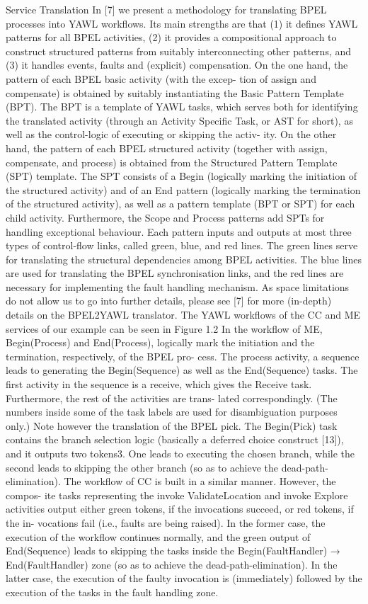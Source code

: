 Service Translation
In [7] we present a methodology for translating BPEL processes into YAWL
workflows. Its main strengths are that (1) it defines YAWL patterns for all
BPEL activities, (2) it provides a compositional approach to construct structured
patterns from suitably interconnecting other patterns, and (3) it handles events,
faults and (explicit) compensation.
On the one hand, the pattern of each BPEL basic activity (with the excep-
tion of assign and compensate) is obtained by suitably instantiating the Basic
Pattern Template (BPT). The BPT is a template of YAWL tasks, which serves
both for identifying the translated activity (through an Activity Specific Task,
or AST for short), as well as the control-logic of executing or skipping the activ-
ity. On the other hand, the pattern of each BPEL structured activity (together
with assign, compensate, and process) is obtained from the Structured Pattern
Template (SPT) template. The SPT consists of a Begin (logically marking the
initiation of the structured activity) and of an End pattern (logically marking
the termination of the structured activity), as well as a pattern template (BPT
or SPT) for each child activity. Furthermore, the Scope and Process patterns add
SPTs for handling exceptional behaviour. Each pattern inputs and outputs at
most three types of control-flow links, called green, blue, and red lines. The green
lines serve for translating the structural dependencies among BPEL activities.
The blue lines are used for translating the BPEL synchronisation links, and the
red lines are necessary for implementing the fault handling mechanism. As space
limitations do not allow us to go into further details, please see [7] for more
(in-depth) details on the BPEL2YAWL translator.
The YAWL workflows of the CC and ME services of our example can be
seen in Figure 1.2 In the workflow of ME, Begin(Process) and End(Process),
logically mark the initiation and the termination, respectively, of the BPEL pro-
cess. The process activity, a sequence leads to generating the Begin(Sequence) as
well as the End(Sequence) tasks. The first activity in the sequence is a receive,
which gives the Receive task. Furthermore, the rest of the activities are trans-
lated correspondingly. (The numbers inside some of the task labels are used for
disambiguation purposes only.) Note however the translation of the BPEL pick.
The Begin(Pick) task contains the branch selection logic (basically a deferred
choice construct [13]), and it outputs two tokens3. One leads to executing the
chosen branch, while the second leads to skipping the other branch (so as to
achieve the dead-path-elimination).
The workflow of CC is built in a similar manner. However, the compos-
ite tasks representing the invoke ValidateLocation and invoke Explore activities
output either green tokens, if the invocations succeed, or red tokens, if the in-
vocations fail (i.e., faults are being raised). In the former case, the execution of
the workflow continues normally, and the green output of End(Sequence) leads
to skipping the tasks inside the Begin(FaultHandler) → End(FaultHandler) zone
(so as to achieve the dead-path-elimination). In the latter case, the execution of
the faulty invocation is (immediately) followed by the execution of the tasks in
the fault handling zone.